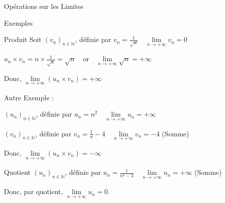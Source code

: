 \documentclass{coursbook}
\begin{document}
\begin{Gpartie}{Opérations sur les Limites}
\begin{Spartie}{Exemples}
\begin{SSpartie}{Produit}
                Soit $(v_n)_{n\in\mathbb{N}}$, définie par $v_n=\frac{1}{\sqrt{n}}\quad\lim\limits_{n\to +\infty}v_n=0$

                $u_n\times v_n=n\times\frac{1}{\sqrt{n}}=\sqrt{n}\quad\text{or}\quad\lim\limits_{n\to +\infty}\sqrt{n}=+\infty$

                Donc, $\lim\limits_{n\to +\infty}(u_n\times v_n)=+\infty$
                
                \vspace{2ex}Autre Exemple :

                $(u_n)_{n\in\mathbb{N}}$, définie par $u_n=n^2\quad\lim\limits_{n\to +\infty}u_n=+\infty$

                $(v_n)_{n\in\mathbb{N}}$, définie par $v_n=\frac{1}{n}-4\quad\lim\limits_{n\to +\infty}v_n=-4$ (Somme)

                Donc, $\lim\limits_{n\to +\infty}(u_n\times v_n)=-\infty$
            \end{SSpartie}
            \begin{SSpartie}{Quotient} 
                $(u_n)_{n\in\mathbb{N}}$, définie par $u_n=\frac{1}{n^2-3}\quad\lim\limits_{n\to +\infty}u_n=+\infty$ (Somme)
                
                Donc, par quotient, $\lim\limits_{n\to +\infty}u_n=0$.
            \end{SSpartie}
        \end{Spartie}
    \end{Gpartie}
    \vfill
    \pagebreak
\end{document}
